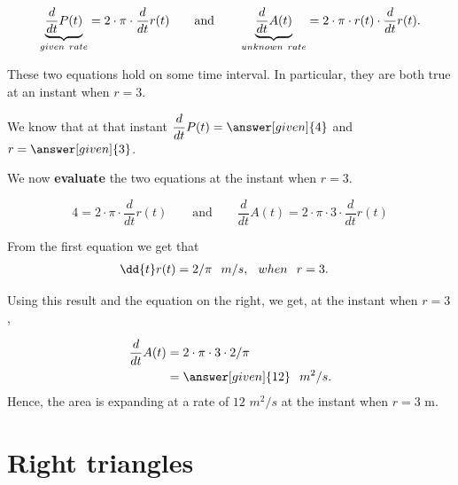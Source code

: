\documentclass{ximera}
\begin{document}
\begin{example}
\begin{explanation}
    \[
  \underbrace{ \dfrac{d}{dt}P(t)}_{given\hspace{0.05in} rate} = 2\cdot \pi\cdot  \dfrac{d}{dt}r(t)
    \qquad\text{and}\qquad
    \underbrace{ \dfrac{d}{dt}A(t)}_{unknown \hspace{0.05in}rate} = 2\cdot \pi\cdot r(t) \cdot  \dfrac{d}{dt}r(t).
    \]
    
    These two equations hold on some time interval. In particular, they are both true at an instant when $r=3$.
    
   We know  that at that instant $ \dfrac{d}{dt}P(t) =
    \answer[given]{4}$ and $r = \answer[given]{3}$. 
    
    We now \textbf{evaluate}  the two equations at the instant when $r=3$.
    
        \[
    4 = 2\cdot \pi\cdot \dfrac{d}{dt}r(t)
    \qquad\text{and}\qquad
  \dfrac{d}{dt}A(t) = 2\cdot \pi\cdot 3 \cdot \dfrac{d}{dt}r(t) 
    \]
    
    
   From the first equation we get that
    \begin{align*}
     \dd{t}r(t)&=  2/\pi \hspace{0.1in} m/s, \hspace{0.1in} when \hspace{0.1in} r=3.    
    \end{align*} 
   
  Using this result and the equation on the right, we get, at the instant when $r=3$,
   
    \begin{align*}
    \dfrac{d}{dt}A(t) &= 2\cdot \pi\cdot 3 \cdot 2/\pi\\
      &=\answer[given]{12}\hspace{0.1in} m^2/s.
    \end{align*}
    Hence, the area is expanding at a rate of $12$ $m^2/s$ at the instant when $r=3$ m.
  \end{explanation}
\end{example}





\section{Right triangles}
\end{document}
